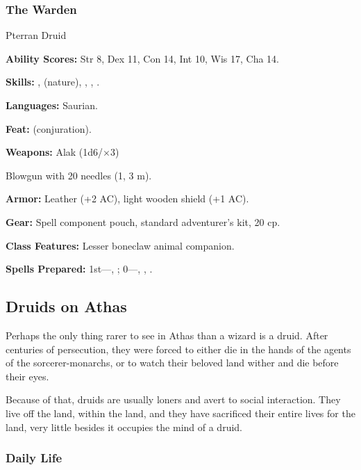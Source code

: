 \subsubsection{The Warden}

Pterran Druid

\textbf{Ability Scores:} Str 8, Dex 11, Con 14, Int 10, Wis 17, Cha 14.

\textbf{Skills:} ,  (nature), , , .

\textbf{Languages:} Saurian.

\textbf{Feat:}  (conjuration).

\textbf{Weapons:} Alak (1d6/$\times$3)

Blowgun with 20 needles (1, 3 m).

\textbf{Armor:} Leather (+2 AC), light wooden shield (+1 AC).

\textbf{Gear:} Spell component pouch, standard adventurer's kit, 20 cp.

\textbf{Class Features:} Lesser boneclaw animal companion.

\textbf{Spells Prepared:} 1st---, ; 0---, , .

\subsection{Druids on Athas}

Perhaps the only thing rarer to see in Athas than a wizard is a druid. After centuries of persecution, they were forced to either die in the hands of the agents of the sorcerer-monarchs, or to watch their beloved land wither and die before their eyes.

Because of that, druids are usually loners and avert to social interaction. They live off the land, within the land, and they have sacrificed their entire lives for the land, very little besides it occupies the mind of a druid.

\subsubsection{Daily Life}

